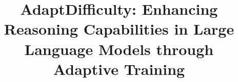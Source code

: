 \documentclass[]{bytedance_seed}
\title{AdaptDifficulty: Enhancing Reasoning Capabilities in Large Language Models through Adaptive Training}
\affiliation{Zhejiang Lab, Hangzhou, China}
\begin{document}
\maketitle





%





% 




\clearpage


% 


\clearpage
\beginappendix

\end{document}
